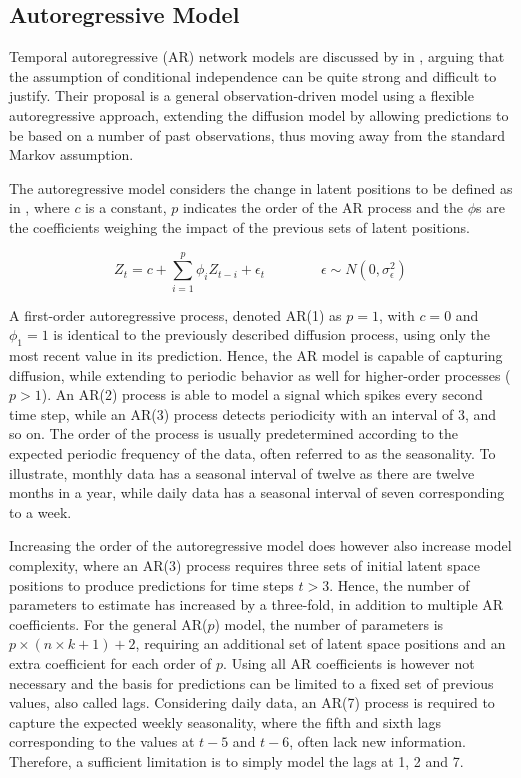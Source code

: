 \subsection{Autoregressive Model}

    Temporal autoregressive (AR) network models are discussed by \citeauthor{sewell2018simultaneous} in \cite{sewell2018simultaneous}, arguing that the assumption of conditional independence can be quite strong and difficult to justify. Their proposal is a general observation-driven model using a flexible autoregressive approach, extending the diffusion model by allowing predictions to be based on a number of past observations, thus moving away from the standard Markov assumption. 
    
    The autoregressive model considers the change in latent positions to be defined as in , where $c$ is a constant, $p$ indicates the order of the AR process and the $\phi$s are the coefficients weighing the impact of the previous sets of latent positions.
    
    \begin{equation}\label{eq:ar-model}
        Z_t = c + \sum_{i=1}^p \phi_i Z_{t-i} + \epsilon_t \qquad\qquad \epsilon \sim N(0,\sigma_\epsilon^2)
    \end{equation}
    
    A first-order autoregressive process, denoted AR(1) as $p=1$, with $c=0$ and $\phi_1=1$ is identical to the previously described diffusion process, using only the most recent value in its prediction. Hence, the AR model is capable of capturing diffusion, while extending to periodic behavior as well for higher-order processes ($p>1$). An AR(2) process is able to model a signal which spikes every second time step, while an AR(3) process detects periodicity with an interval of 3, and so on. The order of the process is usually predetermined according to the expected periodic frequency of the data, often referred to as the seasonality. To illustrate, monthly data has a seasonal interval of twelve as there are twelve months in a year, while daily data has a seasonal interval of seven corresponding to a week.
    
    Increasing the order of the autoregressive model does however also increase model complexity, where an AR(3) process requires three sets of initial latent space positions to produce predictions for time steps $t>3$. Hence, the number of parameters to estimate has increased by a three-fold, in addition to multiple AR coefficients. For the general AR($p$) model, the number of parameters is $p\times (n\times k + 1) + 2$, requiring an additional set of latent space positions and an extra coefficient for each order of $p$.
    Using all AR coefficients is however not necessary and the basis for predictions can be limited to a fixed set of previous values, also called lags. Considering daily data, an AR(7) process is required to capture the expected weekly seasonality, where the fifth and sixth lags corresponding to the values at $t-5$ and $t-6$, often lack new information. Therefore, a sufficient limitation is to simply model the lags at 1, 2 and 7.
    
